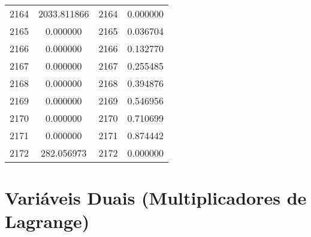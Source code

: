\documentclass[12pt]{article}
\begin{document}
\begin{longtable}{@{}cccc@{}}
2164 & 2033.811866 & 2164 & 0.000000 \\
2165 & 0.000000 & 2165 & 0.036704 \\
2166 & 0.000000 & 2166 & 0.132770 \\
2167 & 0.000000 & 2167 & 0.255485 \\
2168 & 0.000000 & 2168 & 0.394876 \\
2169 & 0.000000 & 2169 & 0.546956 \\
2170 & 0.000000 & 2170 & 0.710699 \\
2171 & 0.000000 & 2171 & 0.874442 \\
2172 & 282.056973 & 2172 & 0.000000 \\

\end{longtable}

\section{Variáveis Duais (Multiplicadores de Lagrange)}
\end{document}
